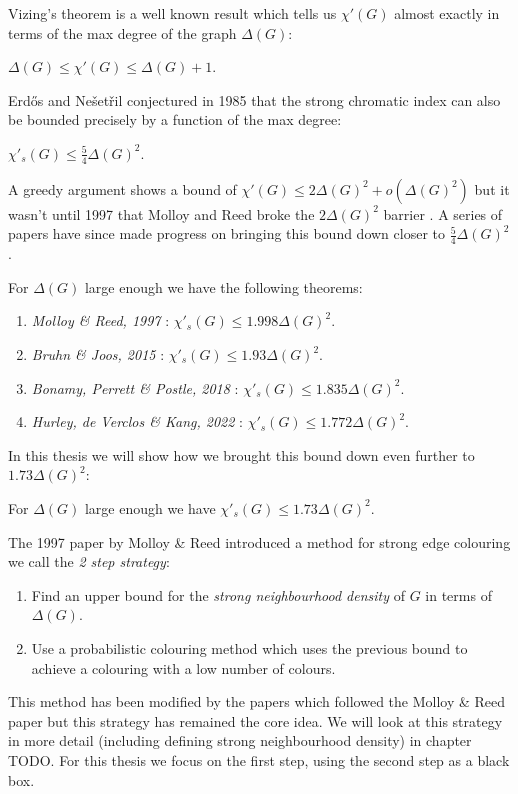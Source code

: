 Vizing's theorem is a well known result which tells us $\chi'(G)$ almost exactly in terms of
the max degree of the graph $\Delta(G)$:
\begin{knowntheorem}[Vizing, 1965]
    $\Delta(G) \leq \chi'(G) \leq \Delta(G) + 1$.
\end{knowntheorem}
Erd\H{o}s and Nešetřil conjectured in 1985 \cite{faudreeInducedMatchingsBipartite1989} that
the strong chromatic index can also be bounded precisely by a function of the max degree:
\begin{conjecture}
    \label{conj:erdos-nesetril}
    $\chi'_s(G) \leq \frac{5}{4}\Delta(G)^2$.
\end{conjecture}
A greedy argument shows a bound of $\chi'(G) \leq 2\Delta(G)^2 + o(\Delta(G)^2)$ but it wasn't until
1997 that Molloy and Reed broke the $2\Delta(G)^2$ barrier \cite{molloyBoundStrongChromatic1997}.
A series of papers have since made progress on bringing this bound down closer to $\frac{5}{4}\Delta(G)^2$.

For $\Delta(G)$ large enough we have the following theorems:
\begin{enumerate}
  \item \textit{Molloy \& Reed, 1997} \cite{molloyBoundStrongChromatic1997}:
        $\chi'_s(G) \leq 1.998\Delta(G)^2$.
  \item \textit{Bruhn \& Joos, 2015} \cite{bruhnStrongerBoundStrong2018}:
        $\chi'_s(G) \leq 1.93\Delta(G)^2$.
  \item \textit{Bonamy, Perrett \& Postle, 2018} \cite{bonamyColouringGraphsSparse2018}:
        $\chi'_s(G) \leq 1.835\Delta(G)^2$.
  \item \textit{Hurley, de Verclos \& Kang, 2022} \cite{hurleyImprovedProcedureColouring2022}:
        $\chi'_s(G) \leq 1.772\Delta(G)^2$.
\end{enumerate}

In this thesis we will show how we brought this bound down even further to $1.73\Delta(G)^2$:
\begin{theorem}
    For $\Delta(G)$ large enough we have
    $\chi'_s(G) \leq 1.73\Delta(G)^2$.
\end{theorem}

The 1997 paper by Molloy \& Reed introduced a method for strong edge colouring we call the
\textit{2 step strategy}:
\begin{enumerate}
    \item Find an upper bound for the \textit{strong neighbourhood density} of $G$ in terms of
        $\Delta(G)$.
    \item Use a probabilistic colouring method which uses the previous bound to achieve a colouring
        with a low number of colours.
\end{enumerate}
This method has been modified by the papers which followed the Molloy \& Reed paper but this
strategy has remained the core idea. We will look at this strategy in more detail (including
defining strong neighbourhood density) in chapter TODO.
For this thesis we focus on the first step, using the second step as a black box.

